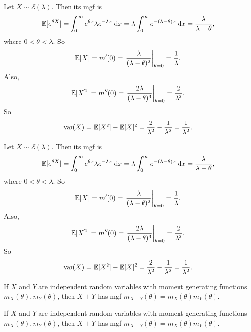 \begin{note}
  \begin{field}
    \begin{eg}
      Let $X\sim \mathcal{E}(\lambda)$. Then its mgf is
      \[
        \mathbb{E}[e^{\theta X}] = \int_0^\infty e^{\theta x}\lambda e^{-\lambda x}\;\mathrm{d} x = \lambda\int_0^\infty e^{-(\lambda - \theta )x}\;\mathrm{d} x = \frac{\lambda}{\lambda - \theta},
      \]
      where $0 < \theta < \lambda$. So
      \[
        \mathbb{E}[X] = m'(0) = \left.\frac{\lambda}{(\lambda - \theta)^2}\right|_{\theta = 0} = \frac{1}{\lambda}.
      \]
      Also,
      \[
        \mathbb{E}[X^2] = m''(0) = \left.\frac{2\lambda}{(\lambda - \theta)^3}\right|_{\theta = 0} = \frac{2}{\lambda^2}.
      \]
      So
      \[
        \operatorname{var}(X) = \mathbb{E}[X^2] - \mathbb{E}[X]^2 = \frac{2}{\lambda^2} - \frac{1}{\lambda^2} = \frac{1}{\lambda^2}.
      \]
    \end{eg}
  \end{field}
  \begin{field}
    \begin{eg}
      Let $X\sim \mathcal{E}(\lambda)$. Then its mgf is
      \[
        \mathbb{E}[e^{\theta X}] = \int_0^\infty e^{\theta x}\lambda e^{-\lambda x}\;\mathrm{d} x = \lambda\int_0^\infty e^{-(\lambda - \theta )x}\;\mathrm{d} x = \frac{\lambda}{\lambda - \theta},
      \]
      where $0 < \theta < \lambda$. So
      \[
        \mathbb{E}[X] = m'(0) = \left.\frac{\lambda}{(\lambda - \theta)^2}\right|_{\theta = 0} = \frac{1}{\lambda}.
      \]
      Also,
      \[
        \mathbb{E}[X^2] = m''(0) = \left.\frac{2\lambda}{(\lambda - \theta)^3}\right|_{\theta = 0} = \frac{2}{\lambda^2}.
      \]
      So
      \[
        \operatorname{var}(X) = \mathbb{E}[X^2] - \mathbb{E}[X]^2 = \frac{2}{\lambda^2} - \frac{1}{\lambda^2} = \frac{1}{\lambda^2}.
      \]
    \end{eg}
  \end{field}
  \xplain{}%
\end{note}

\begin{note}
  \begin{field}
    \begin{thm}
      If $X$ and $Y$ are independent random variables with moment generating functions $m_X(\theta), m_Y(\theta)$, then $X + Y$ has mgf $m_{X + Y}(\theta) = m_X(\theta)m_Y(\theta)$.
    \end{thm}
  \end{field}
  \begin{field}
    \begin{thm}
      If $X$ and $Y$ are independent random variables with moment generating functions $m_X(\theta), m_Y(\theta)$, then $X + Y$ has mgf $m_{X + Y}(\theta) = m_X(\theta)m_Y(\theta)$.
    \end{thm}
  \end{field}
  \xplain{}%
\end{note}

